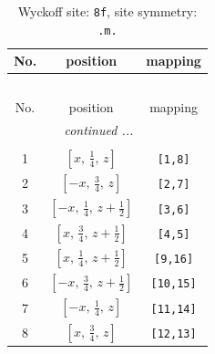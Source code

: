 \documentclass[fleqn,8pt]{jsarticle}
\begin{document}
\begin{longtable}{ccc}
\caption{Wyckoff site: {\tt 8f}, site symmetry: {\tt .m.}}
 \\
 \hline \hline
No. & position & mapping \\ \hline \endfirsthead

\multicolumn{2}{l}{\tablename\ \thetable{}} \\
 \hline \hline
No. & position & mapping \\ \hline \endhead

 \hline \hline
\multicolumn{2}{r}{\footnotesize\it continued ...} \\ \endfoot

 \hline \hline
\multicolumn{2}{r}{} \\ \endlastfoot

1 & $\left[ x,\, \frac{1}{4},\, z \right]$ & {\tt [1,8]} \\ \hline
2 & $\left[ - x,\, \frac{3}{4},\, z \right]$ & {\tt [2,7]} \\ \hline
3 & $\left[ - x,\, \frac{1}{4},\, z + \frac{1}{2} \right]$ & {\tt [3,6]} \\ \hline
4 & $\left[ x,\, \frac{3}{4},\, z + \frac{1}{2} \right]$ & {\tt [4,5]} \\ \hline
5 & $\left[ x,\, \frac{1}{4},\, z + \frac{1}{2} \right]$ & {\tt [9,16]} \\ \hline
6 & $\left[ - x,\, \frac{3}{4},\, z + \frac{1}{2} \right]$ & {\tt [10,15]} \\ \hline
7 & $\left[ - x,\, \frac{1}{4},\, z \right]$ & {\tt [11,14]} \\ \hline
8 & $\left[ x,\, \frac{3}{4},\, z \right]$ & {\tt [12,13]} \\
\end{longtable}
\renewcommand{\arraystretch}{1.2}
\end{document}
